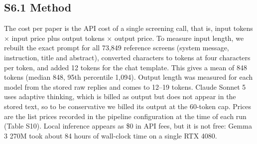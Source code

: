 \documentclass[11pt,a4paper]{article}
\begin{document}
\subsection{S6.1  Method}
The cost per paper is the API cost of a single screening call, that is, input tokens $\times$ input price plus output tokens $\times$ output price. To measure input length, we rebuilt the exact prompt for all 73,849 reference screens (system message, instruction, title and abstract), converted characters to tokens at four characters per token, and added 12 tokens for the chat template. This gives a mean of 848 tokens (median 848, 95th percentile 1,094). Output length was measured for each model from the stored raw replies and comes to 12--19 tokens. Claude Sonnet 5 uses adaptive thinking, which is billed as output but does not appear in the stored text, so to be conservative we billed its output at the 60-token cap. Prices are the list prices recorded in the pipeline configuration at the time of each run (Table S10). Local inference appears as \$0 in API fees, but it is not free: Gemma 3 270M took about 84 hours of wall-clock time on a single RTX 4080.
\end{document}
